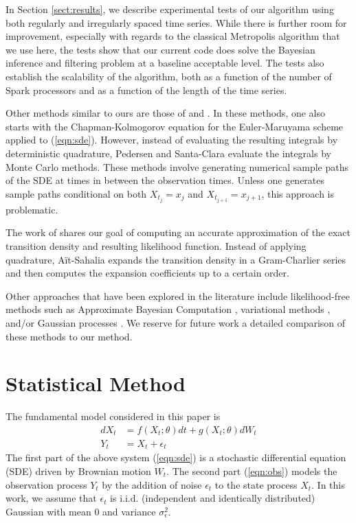 \documentclass[wcp]{jmlr}
\begin{document}
In Section \ref{sect:results}, we describe experimental tests of our
algorithm using both regularly and irregularly spaced time series.
While there is further room for improvement, especially with regards
to the classical Metropolis algorithm that we use here, the tests show
that our current code does solve the Bayesian inference and filtering
problem at a baseline acceptable level.  The tests also establish the
scalability of the algorithm, both as a function of the number of
Spark processors and as a function of the length of the time series.

Other methods similar to ours are those of \citep{Pedersen1995} and
\citep{SantaClara1997}.  In these methods, one also starts with the
Chapman-Kolmogorov equation for the Euler-Maruyama scheme applied to
(\ref{eqn:sde}).  However, instead of evaluating the resulting
integrals by deterministic quadrature, Pedersen and Santa-Clara
evaluate the integrals by Monte Carlo methods.  These methods involve
generating numerical sample paths of the SDE at times in between the
observation times.  Unless one generates sample paths conditional on
both $X_{t_j} = x_j$ and  $X_{t_{j+1}} = x_{j+1}$, this approach is problematic.

The work of \citep{Sahaliaclosedform} shares our goal of computing an accurate approximation of the exact transition density and resulting likelihood function.  Instead of applying quadrature, A\"it-Sahalia expands the transition density in a Gram-Charlier series and then computes the expansion coefficients up to a certain order.  

Other approaches that have been explored in the literature include
likelihood-free methods such as Approximate Bayesian Computation
\citep{Picchini2014}, variational methods \citep{Archambeau2007a,
  Vrettas2015}, and/or Gaussian processes \citep{Archambeau2007,
  Ruttor2013}.  We reserve for future work a detailed comparison of these methods to
our method.

\section{Statistical Method}
\label{sect:methods}
The fundamental model considered in this paper is
\begin{subequations}
\label{eqn:sdefiltprob}
\begin{align}
\label{eqn:sde}
dX_t &= f(X_t; \theta) dt + g(X_t; \theta) dW_t \\
\label{eqn:obs}
Y_t &= X_t + \epsilon_t
\end{align}
\end{subequations}
The first part of the above system (\ref{eqn:sde}) is a stochastic differential
equation (SDE) driven by Brownian motion $W_t$.  The second part
(\ref{eqn:obs}) models the observation process $Y_t$ by the addition
of noise $\epsilon_t$ to the state process $X_t$.  In this work, we
assume that $\epsilon_t$ is i.i.d. (independent and identically
distributed) Gaussian with mean $0$ and variance $\sigma_\epsilon^2$.
\end{document}
